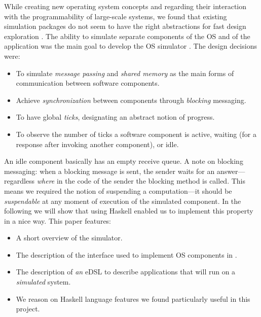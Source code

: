 While creating new operating system concepts and regarding their interaction with the programmability of large-scale systems, we found that existing simulation packages do not seem to have the right abstractions for fast design exploration \cite{cotson,omnet}.
The ability to simulate separate components of the OS and of the application was the main goal to develop the OS simulator \soosim \cite{Baaij:2012}.
The design decisions were:
\begin{itemize}
\item To simulate \emph{message passing} and \emph{shared memory} as the main forms of communication between software components.
\item Achieve \emph{synchronization} between components through \emph{blocking} messaging.
\item To have global \emph{ticks}, designating an abstract notion of progress.
\item To observe the number of ticks a software component is active, waiting (for a response after invoking another component), or idle.
\end{itemize}
An idle component basically has an empty receive queue. 
A note on blocking messaging: when a blocking message is sent, the sender waits for an answer---regardless \emph{where} in the code of the sender the blocking  method is called.
This means we required the notion of suspending a computation---it should be \emph{suspendable} at any moment of execution of the simulated component.
In the following we will show that using Haskell \cite{haskell-report} 
enabled us to implement this property in a nice way.
This paper features:
\begin{itemize}
\item A short overview of the \soosim simulator.
\item The description of the interface used to implement OS components in \soosim.
\item The description of \emph{an} eDSL to describe applications that will run on a \soosim \emph{simulated} system.
\item We reason on Haskell language features we found particularly
  useful in this project. 
\end{itemize}
